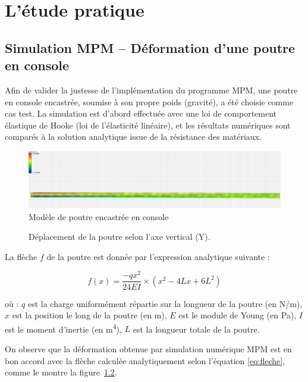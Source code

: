 \documentclass[a4paper,12pt]{report}
\begin{document}
\chapter{L'étude pratique}

\section{Simulation MPM – Déformation d'une poutre en console}

Afin de valider la justesse de l’implémentation du programme MPM, une poutre en console encastrée, soumise à son propre poids (gravité), a été choisie comme cas test.  
La simulation est d’abord effectuée avec une loi de comportement élastique de Hooke (loi de l’élasticité linéaire), et les résultats numériques sont comparés à la solution analytique issue de la résistance des matériaux.

\begin{figure}[h]
\centering
\includegraphics[height=0.13\textheight]{Model_Poutre.png}
\caption{Modèle de poutre encastrée en console}
\label{fig:ModelPoutre}
\end{figure}

\begin{figure}[h]
    \centering
    \small \scalebox{0.6}{}
    \caption{Déplacement de la poutre selon l’axe vertical (Y).}
    \label{fig:deplacementPoutre}
\end{figure}

La flèche $f$ de la poutre est donnée par l'expression analytique suivante :

\begin{equation}
    f(x) = \dfrac{-qx^2}{24EI} \times (x^2 - 4Lx + 6L^2)
    \label{eq:fleche}
\end{equation}

où :
$q$ est la charge uniformément répartie sur la longueur de la poutre (en N/m),
$x$ est la position le long de la poutre (en m),
$E$ est le module de Young (en Pa),
$I$ est le moment d'inertie (en m\textsuperscript{4}),
$L$ est la longueur totale de la poutre.

On observe que la déformation obtenue par simulation numérique MPM est en bon accord avec la flèche calculée analytiquement selon l’équation \eqref{eq:fleche}, comme le montre la figure~\ref{fig:deplacementPoutre}.
\end{document}
